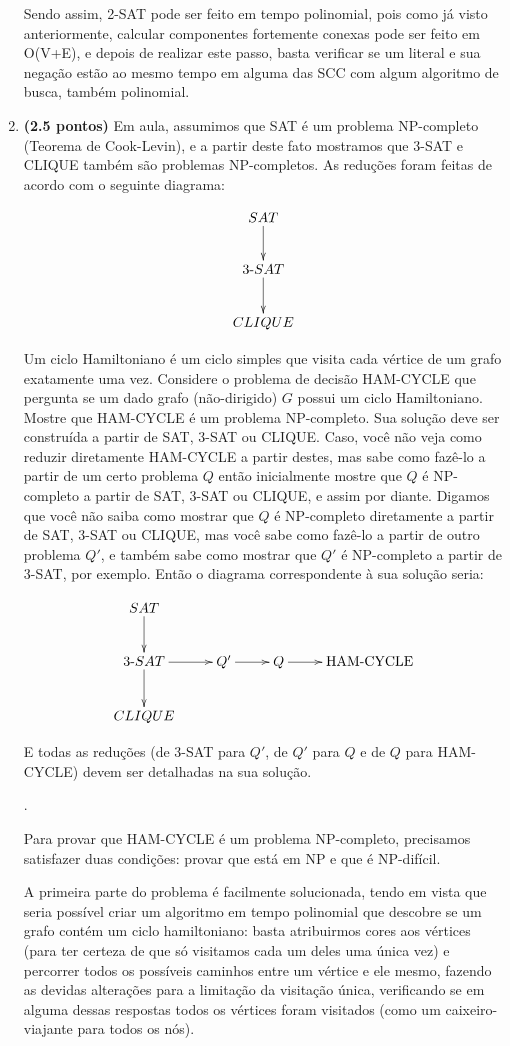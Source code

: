 \documentclass[12pt]{article}
\newcommand{\resposta}[1]{ \noindent {\bf Solução}. {\color{blue} #1}}
\begin{document}
\begin{enumerate}
{  Sendo assim, 2-SAT pode ser feito em tempo polinomial, pois como já visto anteriormente, calcular componentes fortemente conexas pode ser feito em O(V+E), e depois de realizar este passo, basta verificar se um literal e sua negação estão ao mesmo tempo em alguma das SCC com algum algoritmo de busca, também polinomial.

  }
  
\item {\bf (2.5 pontos)} Em aula, assumimos que SAT é um problema
  NP-completo (Teorema de Cook-Levin), e a partir deste fato mostramos
  que 3-SAT e CLIQUE também são problemas NP-completos. As reduções
  foram feitas de acordo com o seguinte diagrama:

  $$\xymatrix{
    SAT \ar[d] \\
    3\mbox{-}SAT \ar[d] \\
    CLIQUE 
  }$$
  
  Um ciclo Hamiltoniano é um ciclo simples que visita cada vértice de
  um grafo exatamente uma vez. Considere o problema de decisão
  HAM-CYCLE que pergunta se um dado grafo (não-dirigido) $G$ possui um
  ciclo Hamiltoniano. Mostre que HAM-CYCLE é um problema
  NP-completo. Sua solução deve ser construída a partir de SAT, 3-SAT
  ou CLIQUE. Caso, você não veja como reduzir diretamente HAM-CYCLE a
  partir destes, mas sabe como fazê-lo a partir de um certo problema
  $Q$ então inicialmente mostre que $Q$ é NP-completo a partir de SAT,
  3-SAT ou CLIQUE, e assim por diante. Digamos que você não saiba como
  mostrar que $Q$ é NP-completo diretamente a partir de SAT, 3-SAT ou
  CLIQUE, mas você sabe como fazê-lo a partir de outro problema $Q'$,
  e também sabe como mostrar que $Q'$ é NP-completo a partir de 3-SAT,
  por exemplo. Então o diagrama correspondente à sua solução seria:

$$\xymatrix{
  SAT \ar[d] & & & \\
  3\mbox{-}SAT \ar[d]\ar[r] & Q' \ar[r] & Q \ar[r] & \mbox{HAM-CYCLE}  \\
  CLIQUE & & & 
}$$

  E todas as reduções (de 3-SAT para $Q'$, de $Q'$ para $Q$ e de $Q$ para HAM-CYCLE) devem ser detalhadas na sua solução.

\resposta{

  Para provar que HAM-CYCLE é um problema NP-completo, precisamos satisfazer duas condições: provar que está em NP e que é NP-difícil.

  A primeira parte do problema é facilmente solucionada, tendo em vista que seria possível criar um algoritmo em tempo polinomial que descobre se um grafo contém um ciclo hamiltoniano: basta atribuirmos cores aos vértices (para ter certeza de que só visitamos cada um deles uma única vez) e percorrer todos os possíveis caminhos entre um vértice e ele mesmo, fazendo as devidas alterações para a limitação da visitação única, verificando se em alguma dessas respostas todos os vértices foram visitados (como um caixeiro-viajante para todos os nós).
  
}
\end{enumerate}
\end{document}

